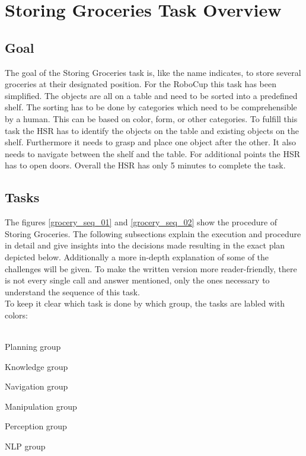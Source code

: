 \documentclass[main.tex]{subfiles}
\begin{document}
	
	\begingroup
	
	\renewcommand{\cleardoublepage}{}
	
	\renewcommand{\clearpage}{}
	
	\chapter{Storing Groceries Task Overview}
	\label{grocery-sequence}
	

	\section{Goal}
	The goal of the Storing Groceries task is, like the name indicates, to store several groceries at their designated position. For the RoboCup this task has been simplified. The objects are all on a table and need to be sorted into a predefined shelf. The sorting has to be done by categories which need to be comprehensible by a human. This can be based on color, form, or other categories. To fulfill this task the HSR has to identify the objects on the table and existing objects on the shelf. Furthermore it needs to grasp and place one object after the other. It also needs to navigate between the shelf and the table. For additional points the HSR has to open doors. Overall the HSR has only 5 minutes to complete the task. 

	\section{Tasks}
	The figures \ref{grocery_seq_01} and \ref{grocery_seq_02} show the procedure of Storing Groceries. The following subsections explain the execution and procedure in detail and give insights into the decisions made resulting in the exact plan depicted below. Additionally a more in-depth explanation of some of the challenges will be given. To make the written version more reader-friendly, there is not every single call and answer mentioned, only the ones necessary to understand the sequence of this task.\\
	To keep it clear which task is done by which group, the tasks are labled with colors:\\
	~\\
	
	\begin{planning}
	Planning group
	\end{planning}
	\begin{knowledge}
	Knowledge group
	\end{knowledge}
	\begin{navigation}
	Navigation group
	\end{navigation}
	\begin{manipulation}
	Manipulation group
	\end{manipulation}
	\begin{perception}
	Perception group
	\end{perception}
	\begin{nlp}
	NLP group
	\end{nlp}
	
\end{document}
